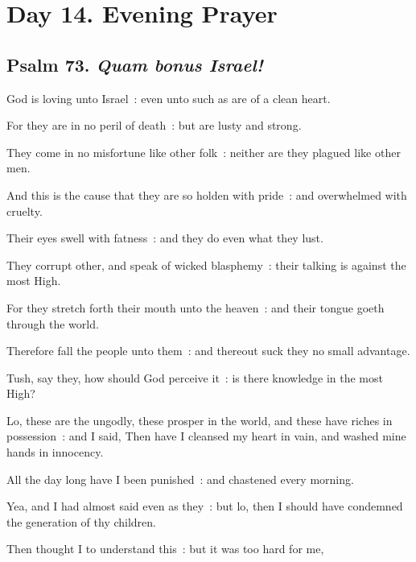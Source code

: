 \section*{Day 14. Evening Prayer}

\subsection{Psalm 73. \textit{Quam bonus Israel!}}

 God is loving unto Israel~: even unto such as are of a clean heart.\par
{}
For they are in no peril of death~: but are lusty and strong.\par
{}They come in no misfortune like other folk~: neither are they plagued like other men.\par
{}And this is the cause that they are so holden with pride~: and overwhelmed with cruelty.\par
{}Their eyes swell with fatness~: and they do even what they lust.\par
{}They corrupt other, and speak of wicked blasphemy~: their talking is against the most High.\par
{}For they stretch forth their mouth unto the heaven~: and their tongue goeth through the world.\par
{}Therefore fall the people unto them~: and thereout suck they no small advantage.\par
{}Tush, say they, how should God perceive it~: is there knowledge in the most High?\par
{}Lo, these are the ungodly, these prosper in the world, and these have riches in possession~: and I said, Then have I cleansed my heart in vain, and washed mine hands in innocency.\par
{}All the day long have I been punished~: and chastened every morning.\par
{}Yea, and I had almost said even as they~: but lo, then I should have condemned the generation of thy children.\par
{}Then thought I to understand this~: but it was too hard for me,\par
